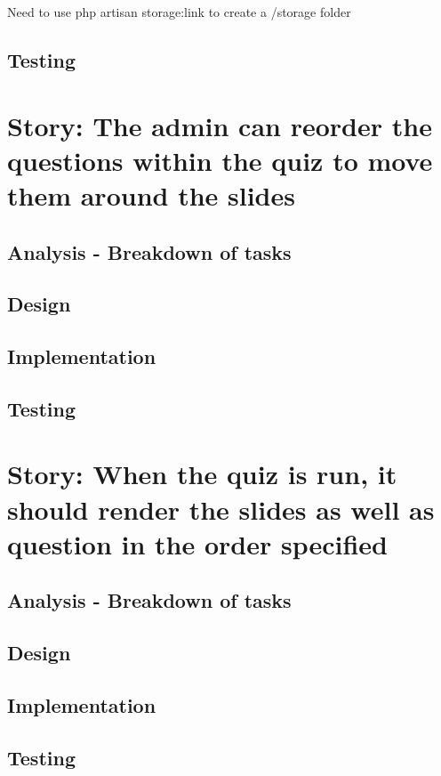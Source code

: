 \documentclass{article}
\begin{document}
Need to use php artisan storage:link to create a /storage folder
\subsection{Testing}
\newpage

\section{Story: The admin can reorder the questions within the quiz to move them around the slides}
\subsection{Analysis - Breakdown of tasks}
\subsection{Design}
\subsection{Implementation}
\subsection{Testing}

\section{Story: When the quiz is run, it should render the slides as well as question in the order specified}
\subsection{Analysis - Breakdown of tasks}
\subsection{Design}
\subsection{Implementation}
\subsection{Testing}

%
%
\end{document}
